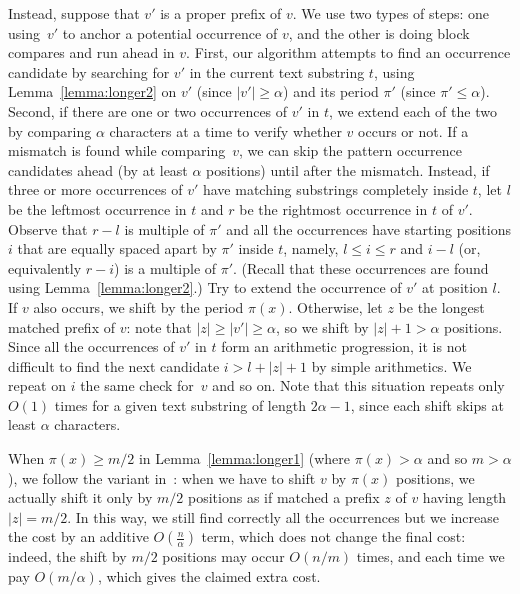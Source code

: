 \documentclass[12pt]{article}
\newcommand{\C}{{\alpha}}
\begin{document}
{Instead, suppose that $v'$ is a proper prefix of $v$. We use two types
of steps: one using~$v'$ to anchor a potential occurrence of $v$, and
the other is doing block compares and run ahead in $v$. First, our
algorithm attempts to find an occurrence candidate by searching for
$v'$ in the current text substring $t$, using
Lemma~\ref{lemma:longer2} on $v'$ (since $|v'| \geq \C$) and its
period $\pi'$ (since $\pi' \leq \C$).  Second, if there are one or two
occurrences of $v'$ in $t$, we extend each of the two by comparing
$\C$ characters at a time to verify whether $v$ occurs or not.  If a
mismatch is found while comparing~$v$, we can skip the pattern
occurrence candidates ahead (by at least $\C$ positions) until after the mismatch.  Instead, if
three or more occurrences of $v'$ have matching substrings completely
inside $t$, let $l$ be the leftmost occurrence in $t$ and $r$ be the
rightmost occurrence in $t$ of $v'$. Observe that $r-l$ is multiple of
$\pi'$ and all the occurrences have starting positions $i$ that are
equally spaced apart by $\pi'$ inside $t$, namely, $l \leq i \leq r$
and $i-l$ (or, equivalently $r-i$) is a multiple of $\pi'$. (Recall
that these occurrences are found using Lemma~\ref{lemma:longer2}.)
Try to extend the occurrence of $v'$ at position $l$. If $v$ also
occurs, we shift by the period $\pi(x)$. Otherwise, let $z$ be the
longest matched prefix of $v$: note that $|z| \geq |v'| \geq \C$, so
we shift by $|z|+1> \C$ positions. Since all the occurrences of $v'$
in $t$ form an arithmetic progression, it is not difficult to find the
next candidate $i > l+|z|+1$ by simple arithmetics. We repeat on $i$
the same check for~$v$ and so on. Note that this situation repeats
only $O(1)$ times for a given text substring of length $2 \C -1$,
since each shift skips at least $\C$ characters. 


\begin{remark}
  When $\pi(x) \geq m/2$ in Lemma~\ref{lemma:longer1} (where $\pi(x) >
  \C$ and so $m > \C$), we follow the variant in~\cite{cp:91}: when we
  have to shift $v$ by $\pi(x)$ positions, we actually shift it only
  by $m/2$ positions as if matched a prefix $z$ of $v$ having length
  $|z|=m/2$. In this way, we still find correctly all the occurrences
  but we increase the cost by an additive $O(\frac{n}{\C})$ term,
  which does not change the final cost: indeed, the shift by $m/2$
  positions may occur $O(n/m)$ times, and each time we pay $O(m/\C)$,
  which gives the claimed extra cost.
\end{remark}
}
\end{document}
